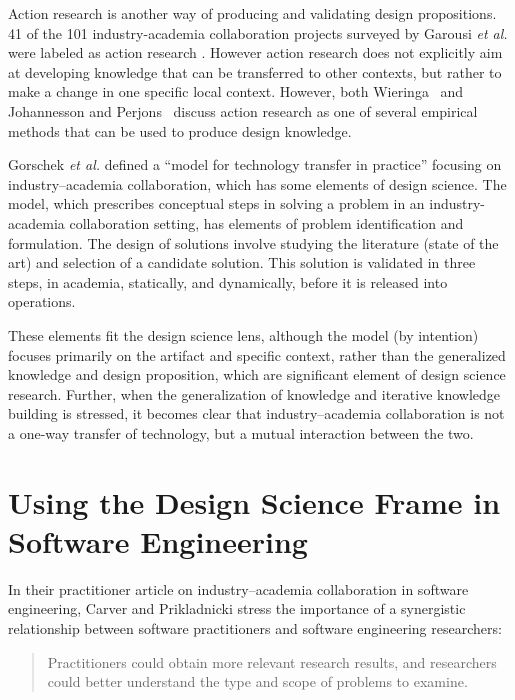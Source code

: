 \documentclass[graybox]{svmult}
\begin{document}
Action research is another way of producing and validating design propositions.  41 of the 101 industry-academia collaboration projects surveyed by Garousi \emph{et al.} were labeled as action research \cite{Garousi2019}. However action research does not explicitly aim at developing knowledge that can be transferred to other contexts, but rather to make a change in one specific local context. However, both Wieringa~\cite{wieringa_technical_2012} and Johannesson and Perjons~\cite{johannesson_introduction_2014} discuss action research as one of several empirical methods that can be used to produce design knowledge.


Gorschek \emph{et al.} defined a ``model for technology transfer in practice'' \cite{GorschekSW2006} focusing on industry--academia collaboration, which has some elements of design science. The model, which prescribes conceptual steps in solving a problem in an industry-academia collaboration setting, has elements of problem identification and formulation. The design of solutions involve studying the literature (state of the art) and selection of a candidate solution. This solution is validated in three steps, in academia, statically, and dynamically, before it is released into operations. 

These elements fit the design science lens, although the model (by intention) focuses primarily on the artifact and specific context, rather than the generalized knowledge and design proposition, which are significant element of design science research. Further, when the generalization of knowledge and iterative knowledge building is stressed, it becomes clear that industry--academia collaboration is not a one-way transfer of technology, but a mutual interaction between the two.


\section{Using the Design Science Frame in Software Engineering}
\label{sec:UsingDSinSE}

In their practitioner article on industry--academia collaboration in software engineering, Carver and Prikladnicki stress the importance of a synergistic relationship between software practitioners and software engineering researchers:
\begin{quote}Practitioners could obtain more relevant research results, and researchers could better understand the type and scope of problems to examine.~\cite{CarverIEEESW2018}
\end{quote} 
\end{document}
